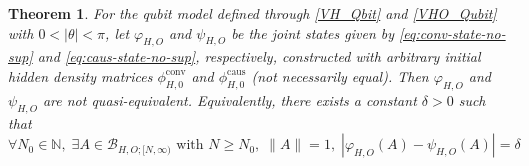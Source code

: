 \documentclass[11pt, reco]{article}
\newtheorem{theorem}{Theorem}[section]
\begin{document}
\begin{theorem}\label{thm:non-quasi-equivalence}
For the qubit model defined through \eqref{VH_Qbit} and \eqref{VHO_Qubit} with $0 < |\theta| < \pi$, let $\varphi_{H,O}$ and $\psi_{H,O}$ be the joint states given by \eqref{eq:conv-state-no-sup} and \eqref{eq:caus-state-no-sup}, respectively, constructed with arbitrary initial hidden density matrices $\phi_{H,0}^{\mathrm{conv}}$ and $\phi_{H,0}^{\mathrm{caus}}$ (not necessarily equal). Then $\varphi_{H,O}$ and $\psi_{H,O}$ are not quasi-equivalent. Equivalently, there exists a constant $\delta > 0$ such that
\begin{equation}\label{eq:non-quasi-distinction}
\forall N_0 \in \mathbb{N},\; \exists A \in \mathcal{B}_{H,O;[N,\infty)} \text{ with } N \ge N_0,\; \|A\| = 1,\; |\varphi_{H,O}(A) - \psi_{H,O}(A)| = \delta
\end{equation}
\end{theorem}
\end{document}
